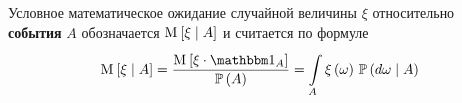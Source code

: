 \begin{comment}
Тут уже уровень $H_k$ играет роль целого множества элементарных исходов,
его мера $\probability{H_k \mcond H_k}$ равна единице,
а мы получаем действительно среднее значение случайной величины $\eta$
на множестве $H_k$, умноженное на вероятность $\probability{H_k}$.
Значит, осталось лишь поделить обе части на $\probability{H_k}$
$$\frac{\Mean{ \eta \cdot \indicatorof{H_k} }}{\probability{H_k}}
      = \integrall{H_k}{\probability{d\omega \mcond H_k}}{
      \eta\left( \omega \right)}$$

\begin{definition}[Условное математическое ожидание случайной величины
  относительно случайного события]
  \label{eventConditionalExpectationDefinition}
  Условное математическое ожидание случайной величины $\xi$
  относительно \textbf{события} $A$ \cite[стр.~68]{BorovkovPT}
  обозначается $\Mean{\xi \mcond A}$ и считается по формуле
  $$\Mean{\xi \mcond A}
      = \frac{\Mean{\xi \cdot \indicatorof{A}}}{\probability{A}}
      = \integrall{A}{\probability{d\omega \mcond A}}{
      \xi\left( \omega \right)}$$
\end{definition}

Пользуясь только что введённым обозначением,
можно более красиво переписать формулу \eqref{discreteConditionalExpectation}
для получения проекции случайной величины $\eta$ на $\sigma$-алгебру,
порождённой уровнями $H_1, H_2, \dots, H_n$ 
$$\tilde{\eta}
  = \sum_{k=1}^n \Mean{ \eta \mcond H_k } \cdot \indicatorof{H_k}$$

Забегая наперёд,
введём определение частного случая условного математического ожидания
случайной величины относительно \textbf{$\sigma$-алгебры},
чтобы обратить внимание на этот важный момент.
\end{comment}
\begin{definition}
  \label{eventConditionalExpectationDefinition}
  Условное математическое ожидание случайной величины $\xi$
  относительно \textbf{события} $A$ \cite[стр.~68]{BorovkovPT}
  обозначается $\operatorname{M}_{} \left[ \xi \;\middle|\; A \right]$ и считается по формуле
  $$\Mean{\xi \mcond A}
      = \frac{\Mean{\xi \cdot \indicatorof{A}}}{\probability{A}}
      = \integrall{A}{\probability{d\omega \mcond A}}{
      \xi\left( \omega \right)}$$
\end{definition}

